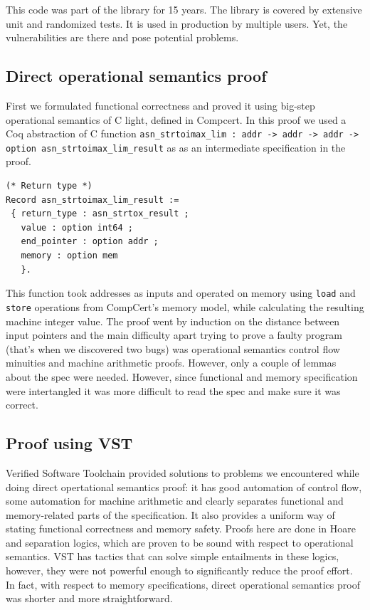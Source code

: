 \documentclass[acmsmall,nonacm]{acmart}
\begin{document}
This code was part of the library for 15 years. The library is covered by extensive unit and randomized tests. It is used in production by multiple users. Yet, the vulnerabilities are there and pose potential problems.

  
\subsection{Direct operational semantics proof}
First we formulated functional correctness and proved it using big-step operational semantics of C light, defined in Compcert. In this proof we used a Coq abstraction of C function \texttt{asn\_strtoimax\_lim : addr -> addr -> addr -> option asn\_strtoimax\_lim\_result} as as an intermediate specification in the proof. 

\begin{lstlisting}[language=Coq]
(* Return type *)
Record asn_strtoimax_lim_result :=
 { return_type : asn_strtox_result ;
   value : option int64 ;
   end_pointer : option addr ;
   memory : option mem 
   }.

\end{lstlisting}

This function took addresses as inputs and operated on memory using \texttt{load} and \texttt{store} operations from CompCert's memory model, while calculating the resulting machine integer value. The proof went by induction on the distance between input pointers and the main difficulty apart trying to prove a faulty program (that's when we discovered two bugs) was operational semantics control flow minuities and machine arithmetic proofs. However, only a couple of lemmas about the spec were needed. However, since functional and memory specification were intertangled it was more difficult to read the spec and make sure it was correct. 

\subsection{Proof using VST}

Verified Software Toolchain provided solutions to problems we encountered while doing direct opertational semantics proof: it has good automation of control flow, some automation for machine arithmetic and clearly separates functional and memory-related parts of the specification. It also provides a uniform way of stating functional correctness and memory safety. Proofs here are done in Hoare and separation logics, which are proven to be sound with respect to operational semantics. VST has tactics that can solve simple entailments in these logics, however, they were not powerful enough to significantly reduce the proof effort. In fact, with respect to memory specifications, direct operational semantics proof was shorter and more straightforward.
\end{document}

